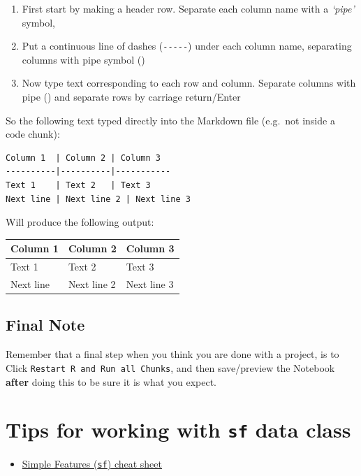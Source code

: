 \documentclass[
]{book}
\providecommand{\tightlist}{%
  \setlength{\itemsep}{0pt}\setlength{\parskip}{0pt}}
\begin{document}
\begin{enumerate}
\def\labelenumi{\arabic{enumi}.}
\tightlist
\item
  First start by making a header row. Separate each column name with a \emph{`pipe'} symbol, \texttt{\textbar{}}
\item
  Put a continuous line of dashes (\texttt{-\/-\/-\/-\/-}) under each column name, separating columns with pipe symbol (\texttt{\textbar{}})
\item
  Now type text corresponding to each row and column. Separate columns with pipe (\texttt{\textbar{}}) and separate rows by carriage return/Enter
\end{enumerate}

So the following text typed directly into the Markdown file (e.g.~not inside a code chunk):

\begin{verbatim}
Column 1  | Column 2 | Column 3
----------|----------|-----------
Text 1    | Text 2   | Text 3
Next line | Next line 2 | Next line 3
\end{verbatim}

Will produce the following output:

\begin{longtable}[]{@{}lll@{}}
\toprule
Column 1 & Column 2 & Column 3 \\
\midrule
\endhead
Text 1 & Text 2 & Text 3 \\
Next line & Next line 2 & Next line 3 \\
\bottomrule
\end{longtable}

\hypertarget{final-note}{%
\section{Final Note}\label{final-note}}

Remember that a final step when you think you are done with a project, is to Click \texttt{Restart\ R\ and\ Run\ all\ Chunks}, and then save/preview the Notebook \textbf{after} doing this to be sure it is what you expect.

\hypertarget{sf-overview}{%
\chapter{\texorpdfstring{Tips for working with \texttt{sf} data class}{Tips for working with sf data class}}\label{sf-overview}}

\begin{itemize}
\tightlist
\item
  \href{https://github.com/rstudio/cheatsheets/raw/master/sf.pdf}{Simple Features (\texttt{sf}) cheat sheet}
\end{itemize}
\end{document}
